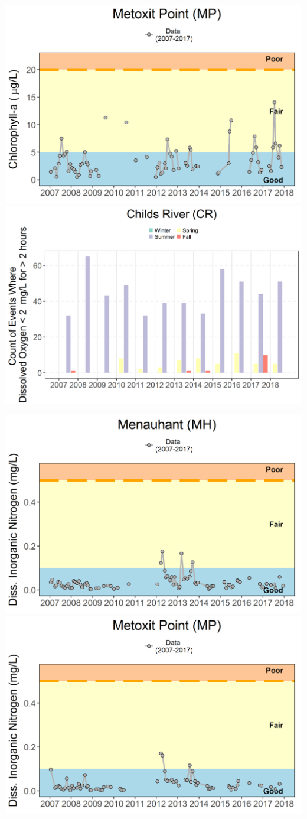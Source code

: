 \documentclass[
  10pt,
]{article}
\let\origfigure\figure
\let\endorigfigure\endfigure
\renewenvironment{figure}[1][2] {
    \expandafter\origfigure\expandafter[H]
} {
    \endorigfigure
}
\begin{document}
\begin{figure}

{\centering \includegraphics[width=0.49\linewidth]{images/NERRs_Chla} \includegraphics[width=0.49\linewidth]{images/NERRs_DO} 

}

\caption{Multiple water quality attributes.}\label{fig:nerr-mult}
\end{figure}

\begin{figure}

{\centering \includegraphics[width=0.49\linewidth]{images/NERRs_MH_DIN} \includegraphics[width=0.49\linewidth]{images/NERRs_MP_DIN} 

}

\caption{Dissolved Inorganic Nitrogen (DIN) in two locations.}\label{fig:nerr-DIN}
\end{figure}
\end{document}
